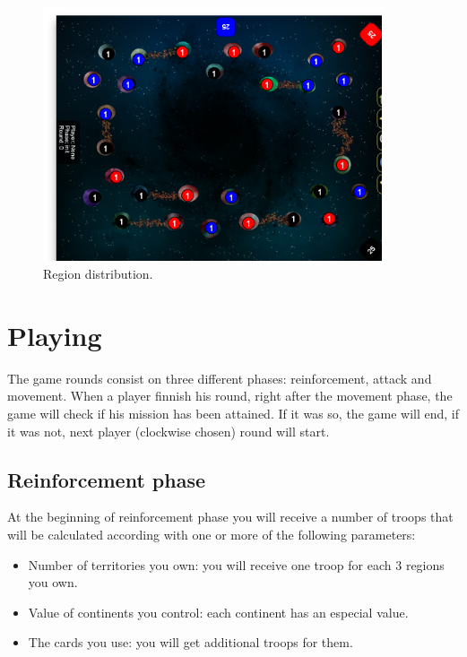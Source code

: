 \documentclass[12pt,a4paper]{article}
\begin{document}
\begin{figure}[h!]
\centering
\includegraphics[width=10cm]{pic/screenshot02.png}
\caption{Region distribution.}
\label{fig:dist}
\end{figure}

\section{Playing}
The game rounds consist on three different phases: reinforcement, attack and movement. When a player finnish his round, right after the movement phase, the game will check if his mission has been attained. If it was so, the game will end, if it was not, next player (clockwise chosen) round will start.

\subsection{Reinforcement phase}
At the beginning of reinforcement phase you will receive a number of troops that will be calculated according with one or more of the following parameters:

\begin{itemize}
\item Number of territories you own: you will receive one troop for each 3 regions you own. 
\item Value of continents you control: each continent has an especial value.
\item The cards you use: you will get additional troops for them.
\end{itemize}
\end{document}
